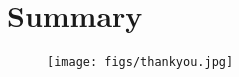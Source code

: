 \section*{Summary}
\begin{frame}{}
  \begin{figure}[htp]
    \begin{center}
      \texttt{[image: figs/thankyou.jpg]}
    \end{center}
  \end{figure}
\end{frame}
